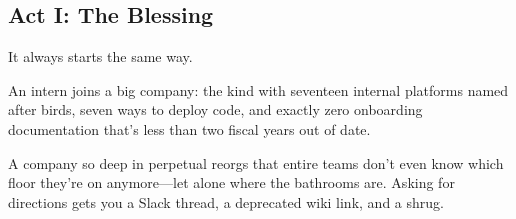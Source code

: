 \subsection{Act I: The Blessing}

It always starts the same way.

An intern joins a big company: the kind with seventeen internal platforms named after birds, seven ways to deploy code, and exactly zero onboarding documentation that's less than two fiscal years out of date.

A company so deep in perpetual reorgs that entire teams don’t even know which floor they're on anymore—let alone where the bathrooms are. Asking for directions gets you a Slack thread, a deprecated wiki link, and a shrug.

\medskip

